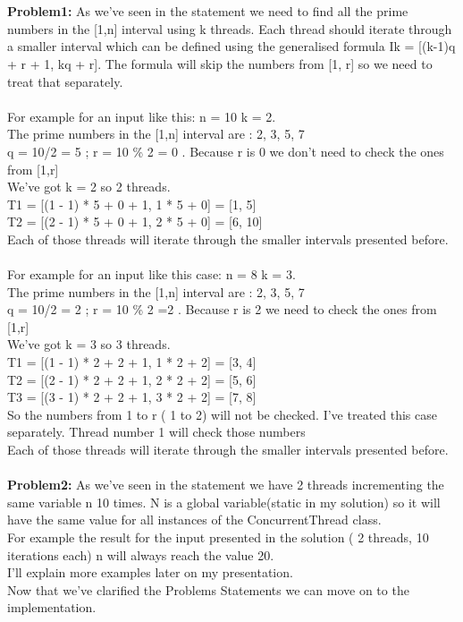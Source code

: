 \documentclass[14pt]{article}
\begin{document}
\newpage
\\\vspace{10 mm}\\
\textbf{Problem1:} As we've seen in the statement we need to find all the prime numbers in the [1,n] interval using k threads. Each thread should iterate through a smaller interval which can be defined using the generalised formula Ik = [(k-1)q + r + 1, kq + r]. The formula will skip the numbers from [1, r] so we need to treat that separately.
\\\vspace{1 mm}\\
For example for an input like this: n = 10 k = 2.\\
The prime numbers in the [1,n] interval are : 2, 3, 5, 7\\
q = 10/2 = 5 ; r = 10 \% 2 = 0 . Because r is 0 we don't need to check the ones from [1,r] \\
We've got k = 2 so 2 threads.\\
T1 = [(1 - 1) * 5 + 0 + 1, 1 * 5 + 0] = [1, 5]\\
T2 = [(2 - 1) * 5 + 0 + 1, 2 * 5 + 0] = [6, 10]\\
Each of those threads will iterate through the smaller intervals presented before.
\\\vspace{1 mm}\\
For example for an input like this case: n = 8 k = 3.\\
The prime numbers in the [1,n] interval are : 2, 3, 5, 7\\
q = 10/2 = 2 ; r = 10 \% 2 =2 . Because r is 2 we need to check the ones from [1,r] \\
We've got k = 3 so 3 threads.\\
T1 = [(1 - 1) * 2 + 2 + 1, 1 * 2 + 2] = [3, 4]\\
T2 = [(2 - 1) * 2 + 2 + 1, 2 * 2 + 2] = [5, 6]\\
T3 = [(3 - 1) * 2 + 2 + 1, 3 * 2 + 2] = [7, 8]\\
So the numbers from 1 to r ( 1 to 2) will not be checked. I've treated this case separately. Thread number 1 will check those numbers\\
Each of those threads will iterate through the smaller intervals presented before.
\\\vspace{1 mm}\\
\textbf{Problem2:} As we've seen in the statement we have 2 threads incrementing the same variable n 10 times. N is a global variable(static in my solution) so it will have the same value for all instances of the ConcurrentThread class.\\
For example the result for the input presented in the solution ( 2 threads, 10 iterations each) n will always reach the value 20.\\
I'll explain more examples later on my presentation.\\
Now that we've clarified the Problems Statements we can move on to the implementation.
\newpage
\end{document}
